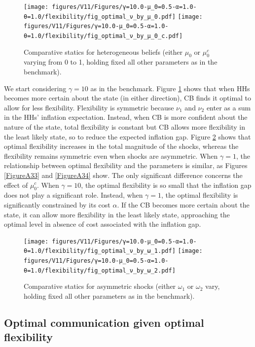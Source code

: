 \documentclass[12pt,a4paper]{article}
\begin{document}
\begin{figure}[h!]
\centering
\texttt{[image: figures/V11/Figures/γ=10.0-μ\_0=0.5-α=1.0-θ=1.0/flexibility/fig\_optimal\_ν\_by\_μ\_0.pdf]}
\texttt{[image: figures/V11/Figures/γ=10.0-μ\_0=0.5-α=1.0-θ=1.0/flexibility/fig\_optimal\_ν\_by\_μ\_0\_c.pdf]}
\caption{Comparative statics for heterogeneous beliefs (either $\mu_0$ or $\mu_0^c$ varying from 0 to 1, holding fixed all other parameters as in the benchmark).}
\label{Figure5}
\end{figure}

We start considering $\gamma=10$ as in the benchmark. Figure \ref{Figure5} shows that when HHs becomes more certain about the state (in either direction), CB finds it optimal to allow for less flexibility. Flexibility is symmetric because $\nu_1$ and $\nu_2$ enter as a sum in the HHs' inflation expectation. Instead, when CB is more confident about the nature of the state, total flexibility is constant but CB allows more flexibility in the least likely state, so to reduce the expected inflation gap. Figure \ref{Figure6} shows that optimal flexibility increases in the total magnitude of the shocks, whereas the flexibility remains symmetric even when shocks are asymmetric. When $\gamma=1$, the relationship between optimal flexibility and the parameters is similar, as Figures \ref{FigureA33} and \ref{FigureA34} show. The only significant difference concerns the effect of $\mu_0^c$. When $\gamma=10$, the optimal flexibility is so small that the inflation gap does not play a significant role. Instead, when $\gamma=1$, the optimal flexibility is significantly constrained by its cost $\alpha$. If the CB becomes more certain about the state, it can allow more flexibility in the least likely state, approaching the optimal level in absence of cost associated with the inflation gap.

\begin{figure}[h!]
\centering
\texttt{[image: figures/V11/Figures/γ=10.0-μ\_0=0.5-α=1.0-θ=1.0/flexibility/fig\_optimal\_ν\_by\_ω\_1.pdf]}
\texttt{[image: figures/V11/Figures/γ=10.0-μ\_0=0.5-α=1.0-θ=1.0/flexibility/fig\_optimal\_ν\_by\_ω\_2.pdf]}
\caption{Comparative statics for asymmetric shocks (either $\omega_1$ or $\omega_2$ vary, holding fixed all other parameters as in the benchmark).}
\label{Figure6}
\end{figure}

\subsection{Optimal communication given optimal flexibility}
\label{sec:nu:interaction}
\end{document}
